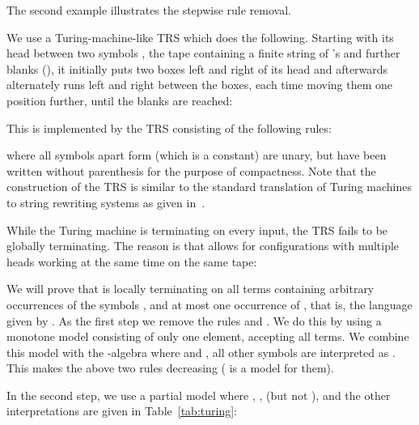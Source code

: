 The second example illustrates the stepwise rule removal.
\begin{example}\label{ex:TM}{\newcommand{\free}{1}      \newcommand{\sright}{R}
  \newcommand{\sleft}{L}
  \newcommand{\slleft}{F}
  \newcommand{\wall}{\Box}   \newcommand{\blank}{0}     \newcommand{\start}{S}
  \newcommand{\tm}{\msf{M}}
  \newcommand{\finish}{\mit{finish}}
We use a Turing-machine-like TRS which does the following.
  Starting with its head between two symbols , the tape
  containing  a finite string of 's and further blanks (),
  it initially puts two boxes  left and right of its head
  and afterwards alternately runs left and right between the boxes,
  each time moving them one position further, until 
the blanks are reached:
  
This is implemented by the TRS  consisting of the following rules:

  where all symbols apart form  (which is a constant) are unary,
  but have been written without parenthesis for the purpose of compactness.
  Note that the construction of the TRS is similar to
 the standard translation of Turing machines
  to string rewriting systems as given in~\cite{terese:03}.

  While the Turing machine is terminating on every input,
  the TRS  fails to be globally terminating.
  The reason is that  allows for configurations with multiple heads working at the same time on the same tape:
  
  We will prove that  is locally terminating on all terms
  containing arbitrary occurrences of the symbols , 
  and at most one occurrence of , that is,
  the language given by .
As the first step we remove the rules  and .
  We do this by using a monotone model  consisting of only one element, accepting all terms.
  We combine this model with the -algebra 
  where 
  and ,
  all other symbols are interpreted as .
  This makes the above two rules decreasing ( is a model for them).



  In the second step, we use a partial model  where ,
  ,  (but not ),
   and the other interpretations are given in Table~\ref{tab:turing}:

}
\end{example}
